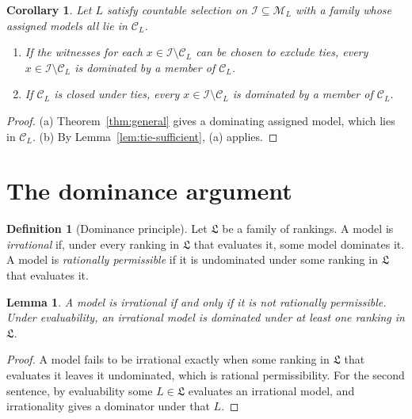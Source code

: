 \documentclass[11pt]{article}
\newtheorem{lemma}[theorem]{Lemma}
\newtheorem{corollary}[theorem]{Corollary}
\theoremstyle{definition}
\newtheorem{definition}[theorem]{Definition}
\theoremstyle{remark}
\newcommand{\M}{\mathcal M}
\newcommand{\C}{\mathcal C}
\newcommand{\I}{\mathcal I}
\newcommand{\Lf}{\mathfrak L}
\begin{document}
\begin{corollary}\label{cor:coherent-assigned}
Let $L$ satisfy countable selection on $\I\subseteq\M_L$ with a family whose assigned models all lie in $\C_L$.
\begin{enumerate}[label=(\alph*)]
\item If the witnesses for each $x\in\I\setminus\C_L$ can be chosen to exclude ties, every $x\in\I\setminus\C_L$ is dominated by a member of $\C_L$.
\item If $\C_L$ is closed under ties, every $x\in\I\setminus\C_L$ is dominated by a member of $\C_L$.
\end{enumerate}
\end{corollary}
\begin{proof}
(a) Theorem~\ref{thm:general} gives a dominating assigned model, which lies in $\C_L$. (b) By Lemma~\ref{lem:tie-sufficient}, (a) applies.
\end{proof}

\section{The dominance argument}\label{sec:conclusion}

\begin{definition}[Dominance principle]\label{def:permissibility}
Let $\Lf$ be a family of rankings. A model is \emph{irrational} if, under every ranking in $\Lf$ that evaluates it, some model dominates it. A model is \emph{rationally permissible} if it is undominated under some ranking in $\Lf$ that evaluates it.
\end{definition}

\begin{lemma}\label{lem:complement}
A model is irrational if and only if it is not rationally permissible. Under evaluability, an irrational model is dominated under at least one ranking in $\Lf$.
\end{lemma}
\begin{proof}
A model fails to be irrational exactly when some ranking in $\Lf$ that evaluates it leaves it undominated, which is rational permissibility. For the second sentence, by evaluability some $L\in\Lf$ evaluates an irrational model, and irrationality gives a dominator under that $L$.
\end{proof}
\end{document}
